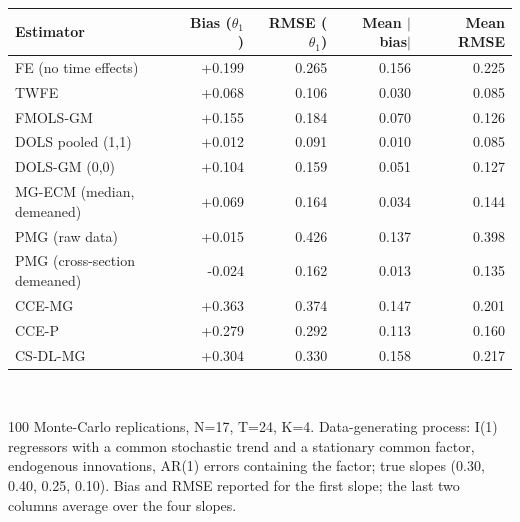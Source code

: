 \begin{tabular}{lrrrr}\toprule
Estimator & Bias ($\theta_1$) & RMSE ($\theta_1$) & Mean $|$bias$|$ & Mean RMSE \\
\midrule
FE (no time effects) & +0.199 & 0.265 & 0.156 & 0.225 \\
TWFE & +0.068 & 0.106 & 0.030 & 0.085 \\
FMOLS-GM & +0.155 & 0.184 & 0.070 & 0.126 \\
DOLS pooled (1,1) & +0.012 & 0.091 & 0.010 & 0.085 \\
DOLS-GM (0,0) & +0.104 & 0.159 & 0.051 & 0.127 \\
MG-ECM (median, demeaned) & +0.069 & 0.164 & 0.034 & 0.144 \\
PMG (raw data) & +0.015 & 0.426 & 0.137 & 0.398 \\
PMG (cross-section demeaned) & -0.024 & 0.162 & 0.013 & 0.135 \\
CCE-MG & +0.363 & 0.374 & 0.147 & 0.201 \\
CCE-P & +0.279 & 0.292 & 0.113 & 0.160 \\
CS-DL-MG & +0.304 & 0.330 & 0.158 & 0.217 \\
\bottomrule\end{tabular}
\\[3pt]\begin{minipage}{\textwidth}\footnotesize 100 Monte-Carlo replications, N=17, T=24, K=4. Data-generating process: I(1) regressors with a common stochastic trend and a stationary common factor, endogenous innovations, AR(1) errors containing the factor; true slopes (0.30, 0.40, 0.25, 0.10). Bias and RMSE reported for the first slope; the last two columns average over the four slopes.\end{minipage}
